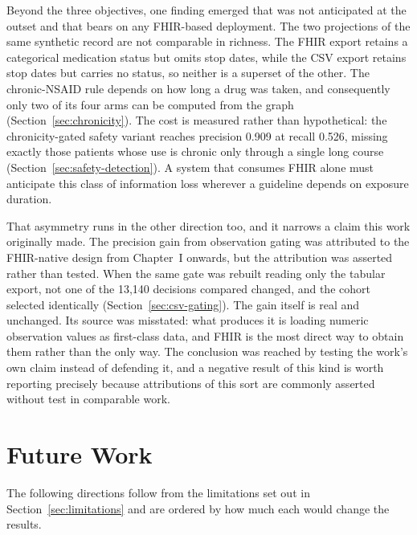 Beyond the three objectives, one finding emerged that was not anticipated at the outset and
that bears on any FHIR-based deployment. The two projections of the same synthetic record
are not comparable in richness. The FHIR export retains a categorical medication status but
omits stop dates, while the CSV export retains stop dates but carries no status, so neither
is a superset of the other. The chronic-NSAID rule depends on how long a drug was taken, and
consequently only two of its four arms can be computed from the graph
(Section~\ref{sec:chronicity}). The cost is measured rather than hypothetical: the
chronicity-gated safety variant reaches precision 0.909 at recall
0.526, missing exactly those patients whose use is chronic only through a
single long course (Section~\ref{sec:safety-detection}). A system that consumes FHIR alone
must anticipate this class of information loss wherever a guideline depends on exposure
duration.

That asymmetry runs in the other direction too, and it narrows a claim this work originally
made. The precision gain from observation gating was attributed to the FHIR-native design from
Chapter~I onwards, but the attribution was asserted rather than tested. When the same gate was
rebuilt reading only the tabular export, not one of the 13{,}140 decisions compared changed, and
the cohort selected identically (Section~\ref{sec:csv-gating}). The gain itself is real and
unchanged. Its source was misstated: what produces it is loading numeric observation values as
first-class data, and FHIR is the most direct way to obtain them rather than the only way. The
conclusion was reached by testing the work's own claim instead of defending it, and a negative
result of this kind is worth reporting precisely because attributions of this sort are
commonly asserted without test in comparable work.

\section{Future Work}

The following directions follow from the limitations set out in
Section~\ref{sec:limitations} and are ordered by how much each would change the results.


